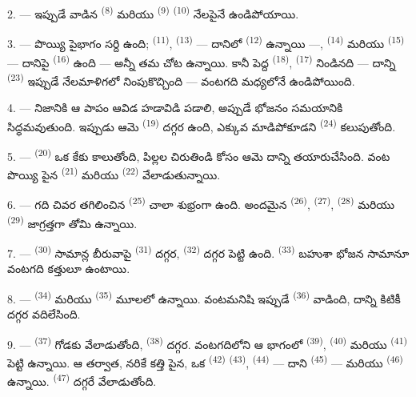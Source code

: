 2. --- ఇప్పుడే వాడిన  \textsuperscript{(8)} మరియు 
\textsuperscript{(9)}  \textsuperscript{(10)} నేలపైనే ఉండిపోయాయి.

3. --- పొయ్యి పైభాగం సర్ది ఉంది;  \textsuperscript{(11)}, 
\textsuperscript{(13)} — దానిలో  \textsuperscript{(12)} ఉన్నాయి —,
 \textsuperscript{(14)} మరియు 
\textsuperscript{(15)} — దానిపై  \textsuperscript{(16)} ఉంది — అన్నీ తమ చోట
ఉన్నాయి. కానీ పెద్ద  \textsuperscript{(18)}, 
\textsuperscript{(17)} నిండినది — దాన్ని  \textsuperscript{(23)} ఇప్పుడే
నేలమాళిగలో నింపుకొచ్చింది — వంటగది మధ్యలోనే ఉండిపోయింది.

4. --- నిజానికి ఆ పాపం ఆవిడ హడావిడి పడాలి, అప్పుడే భోజనం సమయానికి సిద్ధమవుతుంది. ఇప్పుడు ఆమె
 \textsuperscript{(19)} దగ్గర ఉంది, ఎక్కువ మాడిపోకూడని 
\textsuperscript{(24)} కలుపుతోంది.

5. ---  \textsuperscript{(20)} ఒక కేకు కాలుతోంది, పిల్లల చిరుతిండి కోసం ఆమె
దాన్ని తయారుచేసింది. వంట పొయ్యి పైన  \textsuperscript{(21)} మరియు
 \textsuperscript{(22)} వేలాడుతున్నాయి.

\VUsaut{4.0mm}
\VUsaut{3.0mm}

6. --- గది చివర తగిలించిన  \textsuperscript{(25)} చాలా శుభ్రంగా ఉంది.
అందమైన  \textsuperscript{(26)}, 
\textsuperscript{(27)},  \textsuperscript{(28)} మరియు 
\textsuperscript{(29)} జాగ్రత్తగా తోమి ఉన్నాయి.

7. ---  \textsuperscript{(30)} సామాన్ల బీరువాపై 
\textsuperscript{(31)} దగ్గర,  \textsuperscript{(32)} దగ్గర పెట్టి ఉంది.
 \textsuperscript{(33)} బహుశా భోజన సామానూ వంటగది కత్తులూ ఉంటాయి.

8. ---  \textsuperscript{(34)} మరియు  \textsuperscript{(35)}
మూలలో ఉన్నాయి. వంటమనిషి ఇప్పుడే  \textsuperscript{(36)} వాడింది, దాన్ని
కిటికీ దగ్గర వదిలేసింది.

9. ---  \textsuperscript{(37)} గోడకు వేలాడుతోంది, 
\textsuperscript{(38)} దగ్గర. వంటగదిలోని ఆ భాగంలో 
\textsuperscript{(39)},  \textsuperscript{(40)} మరియు 
\textsuperscript{(41)} పెట్టి ఉన్నాయి. ఆ తర్వాత, నరికే కత్తి పైన, ఒక 
\textsuperscript{(42)}  \textsuperscript{(43)}, 
\textsuperscript{(44)} — దాని  \textsuperscript{(45)} — మరియు
 \textsuperscript{(46)} ఉన్నాయి.  \textsuperscript{(47)}
దగ్గరే వేలాడుతోంది.

